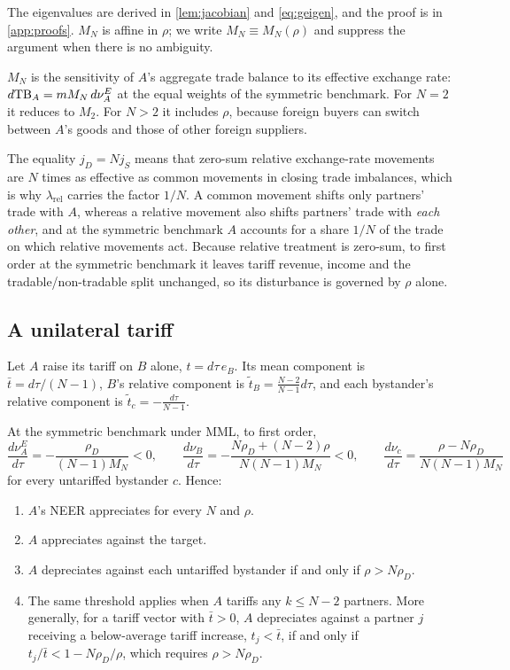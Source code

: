 \noindent The eigenvalues are derived in \cref{lem:jacobian} and \cref{eq:geigen}, and the proof is in \cref{app:proofs}. $M_N$ is affine in $\rho$; we write $M_N\equiv M_N(\rho)$ and suppress the argument when there is no ambiguity.

$M_N$ is the sensitivity of $A$'s aggregate trade balance to its effective exchange rate: $d\mathrm{TB}_A=mM_N\,d\nu^E_A$ at the equal weights of the symmetric benchmark. For $N=2$ it reduces to $M_2$. For $N>2$ it includes $\rho$, because foreign buyers can switch between $A$'s goods and those of other foreign suppliers.

The equality $j_D=Nj_S$ means that zero-sum relative exchange-rate movements are $N$ times as effective as common movements in closing trade imbalances, which is why $\lambda_{\mathrm{rel}}$ carries the factor $1/N$. A common movement shifts only partners' trade with $A$, whereas a relative movement also shifts partners' trade with \emph{each other}, and at the symmetric benchmark $A$ accounts for a share $1/N$ of the trade on which relative movements act. Because relative treatment is zero-sum, to first order at the symmetric benchmark it leaves tariff revenue, income and the tradable/non-tradable split unchanged, so its disturbance is governed by $\rho$ alone.

\subsection{A unilateral tariff}
\label{sec:unilateral}

Let $A$ raise its tariff on $B$ alone, $t=d\tau\,e_B$. Its mean component is $\bar t=d\tau/(N-1)$, $B$'s relative component is $\widetilde t_B=\frac{N-2}{N-1}d\tau$, and each bystander's relative component is $\widetilde t_c=-\frac{d\tau}{N-1}$.

\begin{proposition}
\label{prop:unilateral}
At the symmetric benchmark under MML, to first order,
\begin{equation}
\frac{d\nu^E_A}{d\tau}=-\frac{\rho_D}{(N-1)M_N}<0,\qquad
\frac{d\nu_B}{d\tau}=-\frac{N\rho_D+(N-2)\rho}{N(N-1)M_N}<0,\qquad
\frac{d\nu_c}{d\tau}=\frac{\rho-N\rho_D}{N(N-1)M_N}
\label{eq:unilateral}
\end{equation}
for every untariffed bystander $c$. Hence:
\begin{enumerate}[label=(\roman*)]
\item $A$'s NEER appreciates for every $N$ and $\rho$.
\item $A$ appreciates against the target.
\item $A$ depreciates against each untariffed bystander if and only if $\rho>N\rho_D$.
\item The same threshold applies when $A$ tariffs any $k\leq N-2$ partners. More generally, for a tariff vector with $\bar t>0$, $A$ depreciates against a partner $j$ receiving a below-average tariff increase, $t_j<\bar t$, if and only if $t_j/\bar t<1-N\rho_D/\rho$, which requires $\rho>N\rho_D$.
\end{enumerate}
\end{proposition}

